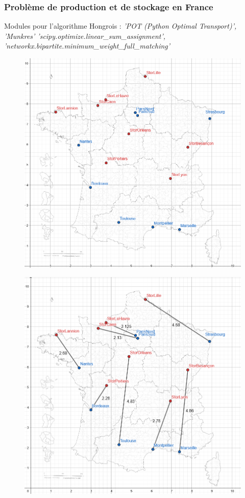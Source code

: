 \documentclass{beamer}
\theoremstyle{definition}
\begin{document}
\begin{frame}
	\frametitle{Problème de production et de stockage en France}
	Modules pour l'algorithme Hongrois : \emph{'POT (Python Optimal Transport)', 'Munkres'
	'scipy.optimize.linear\_sum\_assignment', 'networkx.bipartite.minimum\_weight\_full\_matching'}

			\begin{minipage}[c]{1\linewidth}
		\begin{minipage}[c]{0.45\linewidth}\centering\begin{figure}
				\centering
				\includegraphics[scale= 0.25]{France.png}
		\end{figure}\end{minipage}\quad \quad 
		\begin{minipage}[c]{0.45\linewidth}\centering\begin{figure}
				\includegraphics[scale= 0.25]{France1.png}		

\end{figure}
\end{minipage}
\end{minipage}
\end{frame}
\end{document}
